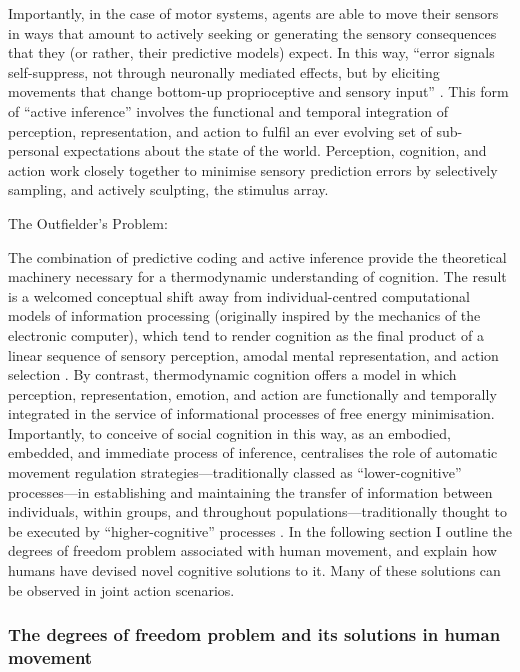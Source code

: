 \begin{CJK}{UTF8}{gbsn}
Importantly, in the case of motor systems, agents are able to move their sensors in ways that amount to actively seeking or generating the sensory consequences that they (or rather, their predictive models) expect.  In this way, ``error signals self-suppress, not through neuronally mediated effects, but by eliciting movements that change bottom-up proprioceptive and sensory input''  \citep[][1349]{Friston2003}.  This form of ``active inference'' involves the functional and temporal integration of perception, representation, and action to fulfil an ever evolving set of sub-personal expectations about the state of the world.  Perception, cognition, and action work closely together to minimise sensory prediction errors by selectively sampling, and actively sculpting, the stimulus array.


The Outfielder's Problem:


The combination of predictive coding and active inference provide the theoretical machinery necessary for a thermodynamic understanding of cognition.  The result is a welcomed conceptual shift away from individual-centred computational models of information processing (originally inspired by the mechanics of the electronic computer), which tend to render cognition as the final product of a linear sequence of sensory perception, amodal mental representation, and action selection \citep{Lewis2005}.  By contrast, thermodynamic cognition offers a model in which perception, representation, emotion, and action are functionally and temporally integrated in the service of informational processes of free energy minimisation.  Importantly,  to conceive of social cognition in this way, as an embodied, embedded, and immediate process of inference, centralises the role of automatic movement regulation strategies---traditionally classed as ``lower-cognitive'' processes---in establishing and maintaining the transfer of information between individuals, within groups, and throughout populations---traditionally thought to be executed by  ``higher-cognitive'' processes \citep{Claidiere2014}.
In the following section I outline the degrees of freedom problem associated with human movement, and explain how humans have devised novel cognitive solutions to it.  Many of these solutions can be observed in joint action scenarios.


\subsubsection{The degrees of freedom problem and its solutions in human movement}


\end{CJK}
